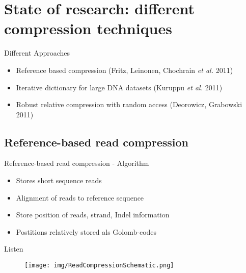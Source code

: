 \documentclass[aspectratio=1610]{beamer}
\begin{document}

\section{State of research: different compression techniques}

\begin{frame}{Different Approaches}
  \begin{itemize}
    \item Reference based compression (Fritz, Leinonen, Chochrain \emph{et al. } 2011)
    \item Iterative dictionary for large DNA datasets (Kuruppu \emph{et al. } 2011)
    \item Robust relative compression with random access (Deorowicz, Grabowski 2011)
  \end{itemize}
\end{frame}

\subsection{Reference-based read compression}
\begin{frame}{Reference-based read compression - Algorithm}
  \begin{itemize}
    \item Stores short sequence reads
    \item Alignment of reads to reference sequence
    \item Store position of reads, strand, Indel information
    \item Postitions relatively stored als Golomb-codes
  \end{itemize}
\end{frame}

\begin{frame}[plain]{Listen}
\vfill
\begin{center}
  \begin{figure}
    \texttt{[image: img/ReadCompressionSchematic.png]}
  \end{figure}
  \vfill
\end{center}
\vfill
\end{frame}
\end{document}

